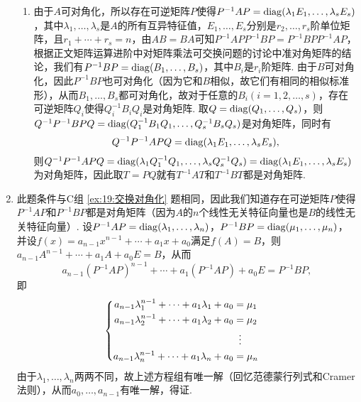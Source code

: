 \begin{enumerate}
\begin{enumerate}
              \item 由于$A$可对角化，所以存在可逆矩阵$P$使得$P^{-1}AP=\operatorname{diag}(\lambda_1E_1,\ldots,\lambda_sE_s)$，其中$\lambda_1,\ldots,\lambda_s$是$A$的所有互异特征值，$E_1,\ldots,E_s$分别是$r_2,\ldots,r_s$阶单位矩阵，且$r_1+\cdots+r_s=n$，由$AB=BA$可知$P^{-1}APP^{-1}BP=P^{-1}BPP^{-1}AP$，根据正文矩阵运算进阶中对矩阵乘法可交换问题的讨论中准对角矩阵的结论，我们有$P^{-1}BP=\operatorname{diag}(B_1,\ldots,B_s)$，其中$B_i$是$r_i$阶矩阵. 由于$B$可对角化，因此$P^{-1}BP$也可对角化（因为它和$B$相似，故它们有相同的相似标准形），从而$B_1,\ldots,B_s$都可对角化，故对于任意的$B_i(i=1,2,\ldots,s)$，存在可逆矩阵$Q_i$使得$Q_i^{-1}B_iQ_i$是对角矩阵. 取$Q=\operatorname{diag}(Q_1,\ldots,Q_s)$，则$Q^{-1}P^{-1}BPQ=\operatorname{diag}(Q_1^{-1}B_1Q_1,\ldots,Q_s^{-1}B_sQ_s)$是对角矩阵，同时有
                    \[Q^{-1}P^{-1}APQ=\operatorname{diag}(\lambda_1E_1,\ldots,\lambda_sE_s),\]
                    则$Q^{-1}P^{-1}APQ=\operatorname{diag}(\lambda_1Q_1^{-1}Q_1,\ldots,\lambda_sQ_s^{-1}Q_s)=\operatorname{diag}(\lambda_1E_1,\ldots,\lambda_sE_s)$为对角矩阵，因此取$T=PQ$就有$T^{-1}AT$和$T^{-1}BT$都是对角矩阵.
          \end{enumerate}

    \item 此题条件与C组 \ref*{ex:19:交换对角化} 题相同，因此我们知道存在可逆矩阵$P$使得$P^{-1}AP$和$P^{-1}BP$都是对角矩阵（因为$A$的$n$个线性无关特征向量也是$B$的线性无关特征向量）. 设$P^{-1}AP=\operatorname{diag}(\lambda_1,\ldots,\lambda_n)$，$P^{-1}BP=\operatorname{diag}(\mu_1,\ldots,\mu_n)$，并设$f(x)=a_{n-1}x^{n-1}+\cdots+a_1x+a_0$满足$f(A)=B$，则$a_{n-1}A^{n-1}+\cdots+a_1A+a_0E=B$，从而
          \[a_{n-1}(P^{-1}AP)^{n-1}+\cdots+a_1(P^{-1}AP)+a_0E=P^{-1}BP,\]
          即
          \[\begin{cases} \begin{aligned}
                      a_{n-1}\lambda_1^{n-1}+\cdots+a_1\lambda_1+a_0 & = \mu_1           \\
                      a_{n-1}\lambda_2^{n-1}+\cdots+a_1\lambda_2+a_0 & = \mu_2           \\
                                                                     & \vdotswithin{ = } \\
                      a_{n-1}\lambda_n^{n-1}+\cdots+a_1\lambda_n+a_0 & = \mu_n
                  \end{aligned} \end{cases}\]
          由于$\lambda_1,\ldots,\lambda_n$两两不同，故上述方程组有唯一解（回忆范德蒙行列式和Cramer法则），从而$a_0,\ldots,a_{n-1}$有唯一解，得证.
\end{enumerate}

\clearpage
